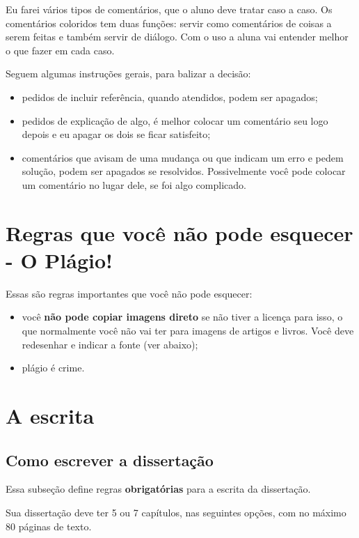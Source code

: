 \documentclass{article}
\begin{document}
Eu farei vários tipos de comentários, que o aluno deve tratar caso a caso. Os comentários coloridos tem duas funções: servir como comentários de coisas a serem feitas e também servir de diálogo. Com o uso a aluna vai entender melhor o que fazer em cada caso.

Seguem algumas instruções gerais, para balizar a decisão:
\begin{itemize}
    \item pedidos de incluir referência, quando atendidos, podem ser apagados;
    \item pedidos de explicação de algo, é melhor colocar um comentário seu logo depois e eu apagar os dois se ficar satisfeito;
    \item comentários que avisam de uma mudança ou que indicam um erro e pedem solução, podem ser apagados se resolvidos. Possivelmente você pode colocar um comentário no lugar dele, se foi algo complicado.
\end{itemize}

\section{Regras que você não pode esquecer - O Plágio!}

Essas são regras importantes que você não pode esquecer:

\begin{itemize}
    \item você \textbf{não pode copiar imagens direto} se não tiver a licença para isso, o que normalmente você não vai ter para imagens de artigos e livros. Você deve redesenhar e indicar a fonte (ver abaixo);
    \item plágio é crime.
\end{itemize}

\section{A escrita}

\subsection{Como escrever a dissertação}

Essa subseção define regras \textbf{obrigatórias} para a escrita da dissertação.

Sua dissertação deve ter 5 ou 7 capítulos, nas seguintes opções, com no máximo 80 páginas de texto.
\end{document}
